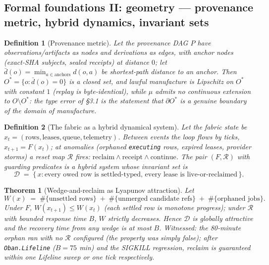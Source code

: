 \documentclass[11pt,a4paper]{article}
\newtheorem{definition}{Definition}
\newtheorem{theorem}{Theorem}
\theoremstyle{remark}
\newcommand{\term}[1]{\texttt{#1}}
\begin{document}
\subsection{Formal foundations II: geometry --- provenance metric, hybrid dynamics, invariant sets}
\begin{definition}[Provenance metric]\label{def:metric}
Let the provenance DAG $P$ have observations/artifacts as nodes and derivations as edges, with anchor nodes (exact-SHA subjects, sealed receipts) at distance $0$; let $\bar{d}(o) = \min_{a \in \mathrm{anchors}} d(o,a)$ be shortest-path distance to an anchor. Then $O^{*} = \{o : \bar{d}(o) = 0\}$ is a closed set, and lawful manufacture is Lipschitz on $O^{*}$ with constant $1$ (replay is byte-identical), while $\mu$ admits \emph{no continuous extension} to $O \setminus O^{*}$: the type error of \S3.1 is the statement that $\partial O^{*}$ is a genuine boundary of the domain of manufacture.
\end{definition}

\begin{definition}[The fabric as a hybrid dynamical system]\label{def:hds}
Let the fabric state be $x_t = (\mathrm{rows}, \mathrm{leases}, \mathrm{queue}, \mathrm{telemetry})$. Between events the loop flows by ticks, $x_{t+1} = F(x_t)$; at anomalies (orphaned \term{executing} rows, expired leases, provider storms) a reset map $\mathcal{R}$ fires: $\mathrm{reclaim} \wedge \mathrm{receipt} \wedge \mathrm{continue}$. The pair $(F, \mathcal{R})$ with guarding predicates is a hybrid system whose invariant set is
\[
\mathcal{D} \;=\; \{\, x : \text{every owed row is settled-typed, every lease is live-or-reclaimed} \,\}.
\]
\end{definition}

\begin{theorem}[Wedge-and-reclaim as Lyapunov attraction]\label{thm:wedge}
Let
\[
W(x) \;=\; \#\{\text{unsettled rows}\} \;+\; \#\{\text{unmerged candidate refs}\} \;+\; \#\{\text{orphaned jobs}\}.
\]
Under $F$, $W(x_{t+1}) \le W(x_t)$ (each settled row is monotone progress); under $\mathcal{R}$ with bounded response time $B$, $W$ strictly decreases. Hence $\mathcal{D}$ is globally attractive and the recovery time from any wedge is at most $B$. \emph{Witnessed}: the 80-minute orphan ran with no $\mathcal{R}$ configured (the property was simply false); after \term{Oban.Lifeline} ($B = 75$ min) and the SIGKILL regression, reclaim is guaranteed within one Lifeline sweep or one tick respectively.
\end{theorem}
\end{document}
